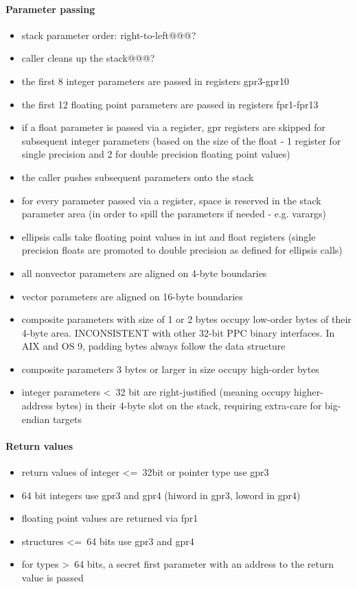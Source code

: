 \paragraph{Parameter passing}

\begin{itemize}
\item stack parameter order: right-to-left@@@?
\item caller cleans up the stack@@@?
\item the first 8 integer parameters are passed in registers gpr3-gpr10
\item the first 12 floating point parameters are passed in registers fpr1-fpr13
\item if a float parameter is passed via a register, gpr registers are skipped for subsequent integer parameters (based on the size of
the float - 1 register for single precision and 2 for double precision floating point values)
\item the caller pushes subsequent parameters onto the stack
\item for every parameter passed via a register, space is reserved in the stack parameter area (in order to spill the parameters if
needed - e.g. varargs)
\item ellipsis calls take floating point values in int and float registers (single precision floats are promoted to double precision
as defined for ellipsis calls)
\item all nonvector parameters are aligned on 4-byte boundaries
\item vector parameters are aligned on 16-byte boundaries
\item composite parameters with size of 1 or 2 bytes occupy low-order bytes of their 4-byte area. INCONSISTENT with other 32-bit PPC
binary interfaces. In AIX and OS 9, padding bytes always follow the data structure
\item composite parameters 3 bytes or larger in size occupy high-order bytes
\item integer parameters \textless\ 32 bit are right-justified (meaning occupy higher-address bytes) in their 4-byte slot on the stack, requiring extra-care for big-endian targets
\end{itemize}


\paragraph{Return values}

\begin{itemize}
\item return values of integer \textless=\ 32bit or pointer type use gpr3
\item 64 bit integers use gpr3 and gpr4 (hiword in gpr3, loword in gpr4)
\item floating point values are returned via fpr1
\item structures \textless=\ 64 bits use gpr3 and gpr4
\item for types \textgreater\ 64 bits, a secret first parameter with an address to the return value is passed
\end{itemize}

